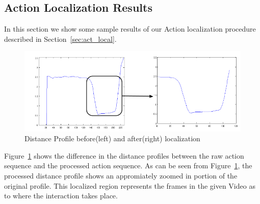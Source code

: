 \documentclass[10pt,twocolumn,letterpaper]{article}
\begin{document}




\subsection{Action Localization Results}
In this section we show some sample results of our Action localization procedure described in Section~\ref{sec:act_local}. 
\begin{figure}[ht]

\includegraphics[scale=0.3]{act_local.png}
\caption{Distance Profile before(left) and after(right) localization}
\label{Fig:act_loc}

\end{figure}
Figure~\ref{Fig:act_loc} shows the difference in the distance profiles between the raw action sequence and the processed action sequence. As can be seen from Figure~\ref{Fig:act_loc}, the processed distance profile shows an appromiately zoomed in portion of the original profile. This localized region represents the frames in the given Video as to where the interaction takes place. 
\end{document}
